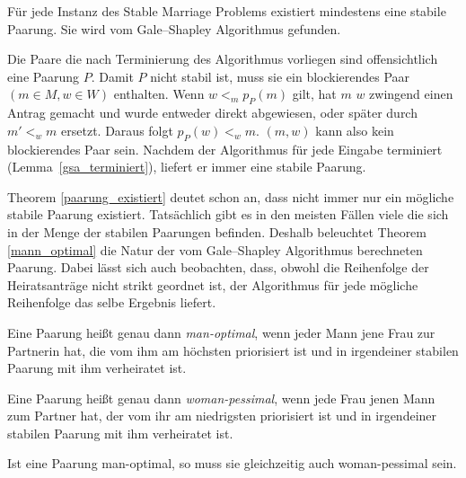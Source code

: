 \begin{Theorem}
\label{paarung_existiert}
  Für jede Instanz des Stable Marriage Problems existiert mindestens eine stabile Paarung. Sie wird vom Gale–Shapley Algorithmus gefunden.
\end{Theorem}

\begin{Beweis}
\label{paarung_existiert_bew}
  Die Paare die nach Terminierung des Algorithmus vorliegen sind offensichtlich eine Paarung $P$. Damit $P$ nicht stabil ist, muss sie ein blockierendes Paar $(m \in M,w \in W)$ enthalten. Wenn $w <_{m} p_{P}(m)$ gilt, hat $m$ $w$ zwingend einen Antrag gemacht und wurde entweder direkt abgewiesen, oder später durch $m' <_{w} m$ ersetzt. Daraus folgt $p_{P}(w) <_{w} m$. $(m,w)$ kann also kein blockierendes Paar sein. Nachdem der Algorithmus für jede Eingabe terminiert (Lemma~\ref{gsa_terminiert}), liefert er immer eine stabile Paarung.
\end{Beweis}

Theorem \ref{paarung_existiert} deutet schon an, dass nicht immer nur ein mögliche stabile Paarung existiert. Tatsächlich gibt es in den meisten Fällen viele die sich in der Menge der stabilen Paarungen befinden. Deshalb beleuchtet Theorem \ref{mann_optimal} die Natur der vom Gale–Shapley Algorithmus berechneten Paarung. Dabei lässt sich auch beobachten, dass, obwohl die Reihenfolge der Heiratsanträge nicht strikt geordnet ist, der Algorithmus für jede mögliche Reihenfolge das selbe Ergebnis liefert.

\begin{Definition}
\label{man_optimal}
  Eine Paarung heißt genau dann \textit{man-optimal}, wenn jeder Mann jene Frau zur Partnerin hat, die vom ihm am höchsten priorisiert ist und in irgendeiner stabilen Paarung mit ihm verheiratet ist.
\end{Definition}

\begin{Definition}
\label{woman_pessimal}
  Eine Paarung heißt genau dann \textit{woman-pessimal}, wenn jede Frau jenen Mann zum Partner hat, der vom ihr am niedrigsten priorisiert ist und in irgendeiner stabilen Paarung mit ihm verheiratet ist.
\end{Definition}

\begin{Lemma}
\label{man_optimal_woman_pessimal}
  Ist eine Paarung man-optimal, so muss sie gleichzeitig auch woman-pessimal sein.
\end{Lemma}

